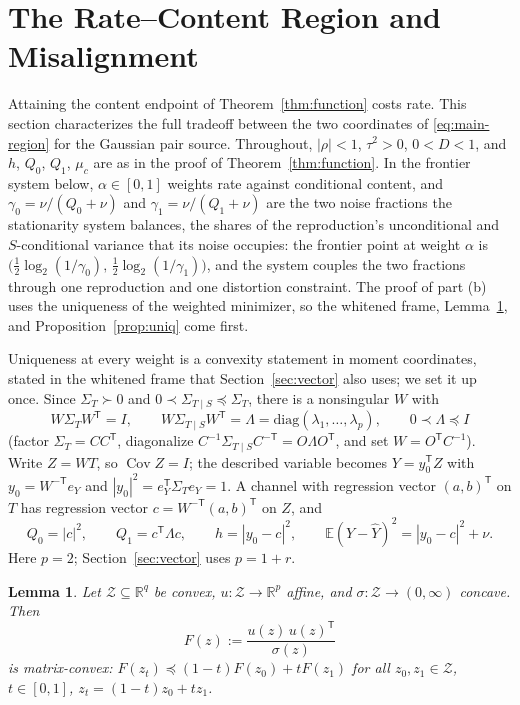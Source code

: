 \documentclass[11pt,onecolumn]{IEEEtran}
\newtheorem{lemma}[theorem]{Lemma}
\newcommand{\E}{\mathbb{E}}
\newcommand{\R}{\mathbb{R}}
\newcommand{\Cov}{\operatorname{Cov}}
\newcommand{\hY}{\widehat{Y}}
\begin{document}
\section{The Rate--Content Region and Misalignment}
\label{sec:region}

Attaining the content endpoint of Theorem~\ref{thm:function} costs rate.
This section characterizes the full tradeoff between the
two coordinates of \eqref{eq:main-region} for the Gaussian pair source.
Throughout, $|\rho|<1$, $\tau^2>0$, $0<D<1$, and $h$, $Q_0$,
$Q_1$, $\mu_c$ are as in the proof of Theorem~\ref{thm:function}. In
the frontier system below, $\alpha\in[0,1]$ weights rate against
conditional content, and $\gamma_0=\nu/(Q_0+\nu)$ and $\gamma_1=\nu/(Q_1+\nu)$
are the two noise fractions the stationarity system balances, the
shares of the reproduction's unconditional and $S$-conditional variance
that its noise occupies: the frontier point at weight $\alpha$ is
$\bigl(\tfrac12\log_2(1/\gamma_0),\,\tfrac12\log_2(1/\gamma_1)\bigr)$, and
the system couples the two fractions through one reproduction and one
distortion constraint. The proof of part (b) uses the uniqueness of the
weighted minimizer, so the whitened frame, Lemma~\ref{lem:mxconvex}, and
Proposition~\ref{prop:uniq} come first.


Uniqueness at every weight is a convexity statement in moment
coordinates, stated in the whitened frame that Section~\ref{sec:vector}
also uses; we set it up once. Since
$\Sigma_T\succ0$ and $0\prec\Sigma_{T\mid S}\preceq\Sigma_T$, there is
a nonsingular $W$ with
\begin{equation}
W\Sigma_TW^{\mathsf T}=I,
\qquad
W\Sigma_{T\mid S}W^{\mathsf T}
=\Lambda=\mathrm{diag}(\lambda_1,\dots,\lambda_p),
\qquad 0\prec\Lambda\preceq I
\label{eq:whitening}
\end{equation}
(factor $\Sigma_T=CC^{\mathsf T}$, diagonalize
$C^{-1}\Sigma_{T\mid S}C^{-\mathsf T}=O\Lambda O^{\mathsf T}$, and set
$W=O^{\mathsf T}C^{-1}$). Write $Z=WT$, so $\Cov Z=I$; the described
variable becomes
$Y=y_0^{\mathsf T}Z$ with $y_0=W^{-\mathsf T}e_Y$ and
$|y_0|^2=e_Y^{\mathsf T}\Sigma_Te_Y=1$. A channel with regression
vector $(a,b)^{\mathsf T}$ on $T$ has regression vector
$c=W^{-\mathsf T}(a,b)^{\mathsf T}$ on $Z$, and
\[
Q_0=|c|^2,\qquad Q_1=c^{\mathsf T}\Lambda c,\qquad
h=|y_0-c|^2,\qquad
\E(Y-\hY)^2=|y_0-c|^2+\nu .
\]
Here $p=2$; Section~\ref{sec:vector} uses $p=1+r$.

\begin{lemma}\label{lem:mxconvex}
Let $\mathcal Z\subseteq\R^q$ be convex, $u:\mathcal Z\to\R^p$ affine,
and $\sigma:\mathcal Z\to(0,\infty)$ concave. Then
\[
F(z):=\frac{u(z)\,u(z)^{\mathsf T}}{\sigma(z)}
\]
is matrix-convex: $F(z_t)\preceq(1-t)F(z_0)+tF(z_1)$ for all
$z_0,z_1\in\mathcal Z$, $t\in[0,1]$, $z_t=(1-t)z_0+tz_1$.
\end{lemma}
\end{document}
